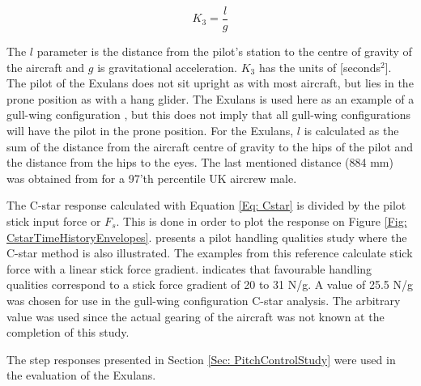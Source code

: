 \documentclass{report}
\begin{document}
\begin{equation}\label{Eq: CstarK3}
	K_3 = \frac{l}{g}
\end{equation}

The $l$ parameter is the distance from the pilot's station to the centre of gravity of the aircraft and $g$ is gravitational acceleration.  $K_3$ has the units of [seconds$^2$].  The pilot of the Exulans does not sit upright as with most aircraft, but lies in the prone position as with a hang glider.  The Exulans is used here as an example of a gull-wing configuration , but this does not imply that all gull-wing configurations will have the pilot in the prone position.  For the Exulans, $l$ is calculated as the sum of the distance from the aircraft centre of gravity to the hips of the pilot and the distance from the hips to the eyes.  The last mentioned distance (884 mm) was obtained from \cite{DEFSTANhuman} for a 97'th percentile UK aircrew male.  

The C-star response calculated with Equation \ref{Eq: Cstar} is divided by the pilot stick input force or $F_s$.  This is done in order to plot the response on Figure \ref{Fig: CstarTimeHistoryEnvelopes}.  \cite{NealSmith} presents a pilot handling qualities study where the C-star method is also illustrated.  The examples from this reference calculate stick force with a linear stick force gradient.   indicates that favourable handling qualities correspond to a stick force gradient of 20 to 31 N/g.  A value of 25.5 N/g was chosen for use in the gull-wing configuration C-star analysis.  The arbitrary value was used since the actual gearing of the aircraft was not known at the completion of this study.   

The step responses presented in Section \ref{Sec: PitchControlStudy} were used in the evaluation of the Exulans. 

\end{document}

